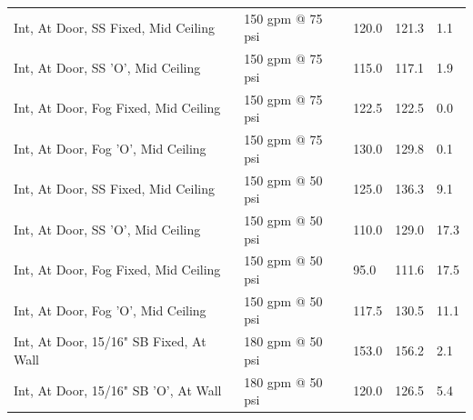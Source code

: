 \documentclass{article}
\begin{document}
\begin{table}[]
\begin{tabular}{lllll}
Int, At Door, SS Fixed, Mid Ceiling                   & 150 gpm @ 75 psi                    & 120.0                                  & 121.3                                   & 1.1                                     \\
Int, At Door, SS 'O', Mid Ceiling                     & 150 gpm @ 75 psi                    & 115.0                                  & 117.1                                   & 1.9                                     \\
Int, At Door, Fog Fixed, Mid Ceiling                  & 150 gpm @ 75 psi                    & 122.5                                  & 122.5                                   & 0.0                                     \\
Int, At Door, Fog 'O', Mid Ceiling                    & 150 gpm @ 75 psi                    & 130.0                                  & 129.8                                   & 0.1                                     \\
Int, At Door, SS Fixed, Mid Ceiling                   & 150 gpm @ 50 psi                    & 125.0                                  & 136.3                                   & 9.1                                     \\
Int, At Door, SS 'O', Mid Ceiling                     & 150 gpm @ 50 psi                    & 110.0                                  & 129.0                                   & 17.3                                    \\
Int, At Door, Fog Fixed, Mid Ceiling                  & 150 gpm @ 50 psi                    & 95.0                                   & 111.6                                   & 17.5                                    \\
Int, At Door, Fog 'O', Mid Ceiling                    & 150 gpm @ 50 psi                    & 117.5                                  & 130.5                                   & 11.1                                    \\
Int, At Door, 15/16" SB Fixed, At Wall                & 180 gpm @ 50 psi                    & 153.0                                  & 156.2                                   & 2.1                                     \\
Int, At Door, 15/16" SB 'O', At Wall                  & 180 gpm @ 50 psi                    & 120.0                                  & 126.5                                   & 5.4                                     \\

\end{tabular}
\end{table}
\end{document}
